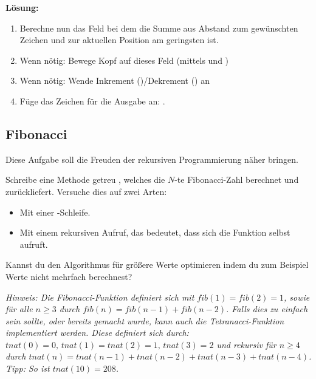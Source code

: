 \documentclass[table]{sopra-base}
\makeatletter
\let\T\texttt
\newenvironment{solution}{\null\par\noindent\textbf{\textcolor{sob@col@uulm@cs}{Lösung:}}\newline\bgroup\color{black}\slshape\ignorespaces}{\egroup}
\makeatother
\begin{document}
\begin{solution}
\begin{enumerate}
        \item Berechne nun das Feld bei dem die Summe aus Abstand zum gewünschten Zeichen und zur aktuellen Position am geringsten ist.
        \item Wenn nötig: Bewege Kopf auf dieses Feld (mittels \say{\T{>}} und \say{\T{<}})
        \item Wenn nötig: Wende Inkrement (\T{\say{+}})/Dekrement (\T{\say{-}}) an
        \item Füge das Zeichen für die Ausgabe an: \say{\T{!}}.
    \end{enumerate}
\end{solution}

\subsection{Fibonacci}

Diese Aufgabe soll die Freuden der rekursiven Programmierung näher bringen.

Schreibe eine Methode getreu , welches die $N$-te Fibonacci-Zahl berechnet und zurückliefert. Versuche dies auf zwei Arten:
\begin{itemize}[nolistsep]
    \item Mit einer -Schleife.
    \item Mit einem rekursiven Aufruf, das bedeutet, dass sich die Funktion selbst aufruft.
\end{itemize}
Kannst du den Algorithmus für größere Werte optimieren indem du zum Beispiel Werte nicht mehrfach berechnest?\par{}
\textit{Hinweis: Die Fibonacci-Funktion definiert sich mit $fib(1) = fib(2) = 1$, sowie für alle $n \geq 3$ durch $fib(n) = fib(n-1) + fib(n-2)$. Falls dies zu einfach sein sollte, oder bereits gemacht wurde, kann auch die Tetranacci-Funktion implementiert werden. Diese definiert sich durch: $tnat(0) = 0,\, tnat(1) = tnat(2) = 1,\,tnat(3) = 2$ und rekursiv für $n \geq 4$ durch $tnat(n) = tnat(n-1) + tnat(n-2) + tnat(n-3) + tnat(n-4)$. Tipp: So ist $tnat(10) = 208$.}
\end{document}

